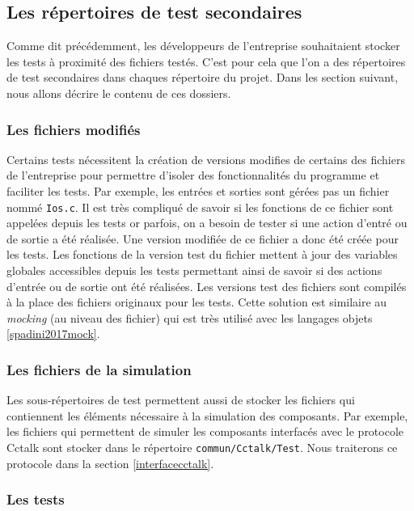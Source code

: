 \documentclass[a4paper]{article}
\begin{document}
\subsection{Les répertoires de test secondaires}

Comme dit précédemment, les développeurs de l'entreprise souhaitaient stocker
les tests à proximité des fichiers testés. C'est pour cela que l'on a des
répertoires de test secondaires dans chaques répertoire du projet. Dans les
section suivant, nous allons décrire le contenu de ces dossiers.

\subsubsection{Les fichiers modifiés}

Certains tests nécessitent la création de versions modifies de certains des
fichiers de l'entreprise pour permettre d'isoler des fonctionnalités du
programme et faciliter les tests. Par exemple, les entrées et sorties sont
gérées pas un fichier nommé \verb|Ios.c|. Il est très compliqué de savoir si les
fonctions de ce fichier sont appelées depuis les tests or parfois, on a besoin
de tester si une action d'entré ou de sortie a été réalisée. Une version modifiée
de ce fichier a donc été créée pour les tests. Les fonctions de la version test
du fichier mettent à jour des variables globales accessibles depuis les tests
permettant ainsi de savoir si des actions d'entrée ou de sortie ont été
réalisées. Les versions test des fichiers sont compilés à la place des fichiers
originaux pour les tests. Cette solution est similaire au \textit{mocking} (au
niveau des fichier) qui est très utilisé avec les langages objets
\ref{spadini2017mock}.

\subsubsection{Les fichiers de la simulation}

Les sous-répertoires de test permettent aussi de stocker les fichiers qui
contiennent les éléments nécessaire à la simulation des composants. Par exemple,
les fichiers qui permettent de simuler les composants interfacés avec le
protocole Cctalk sont stocker dans le répertoire \verb|commun/Cctalk/Test|. Nous
traiterons ce protocole dans la section \ref{interfacecctalk}.

\subsubsection{Les tests}
\end{document}
